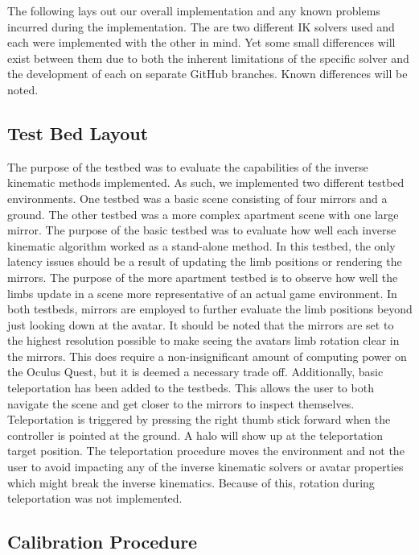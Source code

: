 \documentclass{vgtc}                          %
\begin{document}
    The following lays out our overall implementation and any known problems incurred during the implementation. The are two different IK solvers used and each were implemented with the other in mind. Yet some small differences will exist between them due to both the inherent limitations of the specific solver and the development of each on separate GitHub branches. Known differences will be noted.

\subsection{Test Bed Layout}

    The purpose of the testbed was to evaluate the capabilities of the inverse kinematic methods implemented. As such, we implemented two different testbed environments. One testbed was a basic scene consisting of four mirrors and a ground. The other testbed was a more complex apartment scene with one large mirror. The purpose of the basic testbed was to evaluate how well each inverse kinematic algorithm worked as a stand-alone method. In this testbed, the only latency issues should be a result of updating the limb positions or rendering the mirrors. The purpose of the more apartment testbed is to observe how well the limbs update in a scene more representative of an actual game environment. In both testbeds, mirrors are employed to further evaluate the limb positions beyond just looking down at the avatar. It should be noted that the mirrors are set to the highest resolution possible to make seeing the avatars limb rotation clear in the mirrors. This does require a non-insignificant amount of computing power on the Oculus Quest, but it is deemed a necessary trade off. Additionally, basic teleportation has been added to the testbeds. This allows the user to both navigate the scene and get closer to the mirrors to inspect themselves. Teleportation is triggered by pressing the right thumb stick forward when the controller is pointed at the ground. A halo will show up at the teleportation target position. The teleportation procedure moves the environment and not the user to avoid impacting any of the inverse kinematic solvers or avatar properties which might break the inverse kinematics. Because of this, rotation during teleportation was not implemented.

\subsection{Calibration Procedure}
\end{document}
